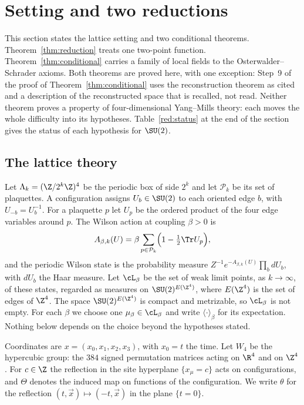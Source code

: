 \section{Setting and two reductions}\label{sec:reduction}

This section states the lattice setting and two conditional theorems. Theorem~\ref{thm:reduction} treats one two-point function. Theorem~\ref{thm:conditional} carries a family of local fields to the Osterwalder--Schrader axioms. Both theorems are proved here, with one exception: Step~9 of the proof of Theorem~\ref{thm:conditional} uses the reconstruction theorem as cited and a description of the reconstructed space that is recalled, not read. Neither theorem proves a property of four-dimensional Yang--Mills theory: each moves the whole difficulty into its hypotheses. Table~\ref{red:status} at the end of the section gives the status of each hypothesis for $\SU(2)$.

\subsection{The lattice theory}\label{red:setting}

Let $\Lambda_k=(\Z/2^k\Z)^4$ be the periodic box of side $2^k$ and let $\mathcal{P}_k$ be its set of plaquettes. A configuration assigns $U_b\in\SU(2)$ to each oriented edge $b$, with $U_{-b}=U_b^{-1}$. For a plaquette $p$ let $U_p$ be the ordered product of the four edge variables around $p$. The Wilson action at coupling $\beta>0$ is
\begin{equation}\label{red:action}
  A_{\beta,k}(U)=\beta\sum_{p\in\mathcal{P}_k}\Bigl(1-\tfrac12\Tr U_p\Bigr),
\end{equation}
and the periodic Wilson state is the probability measure $Z^{-1}e^{-A_{\beta,k}(U)}\prod_b dU_b$, with $dU_b$ the Haar measure. Let $\cL_\beta$ be the set of weak limit points, as $k\to\infty$, of these states, regarded as measures on $\SU(2)^{E(\Z^4)}$, where $E(\Z^4)$ is the set of edges of $\Z^4$. The space $\SU(2)^{E(\Z^4)}$ is compact and metrizable, so $\cL_\beta$ is not empty. For each $\beta$ we choose one $\mu_\beta\in\cL_\beta$ and write $\langle\cdot\rangle_\beta$ for its expectation. Nothing below depends on the choice beyond the hypotheses stated.

Coordinates are $x=(x_0,x_1,x_2,x_3)$, with $x_0=t$ the time. Let $W_4$ be the hypercubic group: the $384$ signed permutation matrices acting on $\R^4$ and on $\Z^4$. For $c\in\Z$ the reflection in the site hyperplane $\{x_\mu=c\}$ acts on configurations, and $\Theta$ denotes the induced map on functions of the configuration. We write $\theta$ for the reflection $(t,\vec x)\mapsto(-t,\vec x)$ in the plane $\{t=0\}$.

